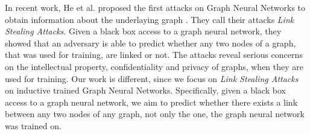   In recent work, He et al. proposed the first attacks on Graph Neural Networks to obtain information about the underlaying graph \cite{DBLP:journals/corr/abs-2005-02131}.
  They call their attacks \emph{Link Stealing Attacks}.
  Given a black box access to a graph neural network, they showed that an adversary is able to predict whether any two nodes of a graph, that was used for training, are linked or not.
  The attacks reveal serious concerns on the intellectual property, confidentiality and privacy of graphs, when they are used for training.
  Our work is different, since we focus on \emph{Link Stealing Attacks} on inductive trained Graph Neural Networks.
  Specifically, given a black box access to a graph neural network, we aim to predict whether there exists a link between any two nodes of any graph, not only the one, the graph neural network was trained on.
